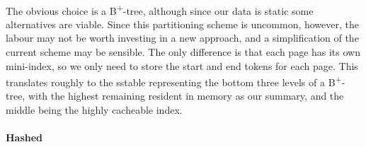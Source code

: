 \documentclass[fleqn]{article}
\begin{document}
\paragraph{}
    The obvious choice is a B\textsuperscript{+}-tree, although since our data is static some alternatives are viable.
    Since this partitioning scheme is uncommon, however, the labour may not be worth investing in a new approach,
    and a simplification of the current scheme may be sensible. The only difference is that each page has its own
    mini-index, so we only need to store the start and end tokens for each page. This translates roughly to 
    the sstable representing the bottom three levels of a B\textsuperscript{+}-tree, with the highest 
    remaining resident in memory as our summary, and the middle being the highly cacheable index.
\paragraph{Hashed}
\end{document}

